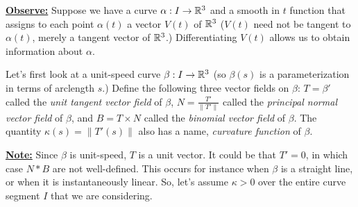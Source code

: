 \underline{\textbf{Observe:}} Suppose we have a curve $\alpha: I
\rightarrow \mathbb{R}^3$ and a smooth in $t$ function that assigns to each
point $\alpha(t)$ a vector $V(t)$ of $\mathbb{R}^3$ ($V(t)$ need not be
tangent to $\alpha(t)$, merely a tangent vector of $\mathbb{R}^3$.)
Differentiating $V(t)$ allows us to obtain information about
$\alpha$.

Let's first look at a unit-speed curve $\beta: I \rightarrow \mathbb{R}^3$
(so $\beta(s)$ is a parameterization in terms of arclength $s$.)
Define the following three vector fields on $\beta$: $T = \beta'$
called the \textit{unit tangent vector field} of $\beta$, $N =
\frac{T'}{\|T'\|}$ called the \textit{principal normal vector
  field} of $\beta$, and $B = T \times N$ called the
\textit{binomial vector field} of $\beta$.
The quantity $\kappa(s) = \|T'(s)\|$ also has a name,
\textit{curvature function} of $\beta$.


\underline{\textbf{Note:}} Since $\beta$ is unit-speed, $T$ is a unit
vector. It could be that $T' = 0$, in which case $N * B$ are not
well-defined. This occurs for instance when $\beta$ is a straight
line, or when it is instantaneously linear. So, let's assume $\kappa >
0$ over the entire curve segment $I$ that we are considering.

